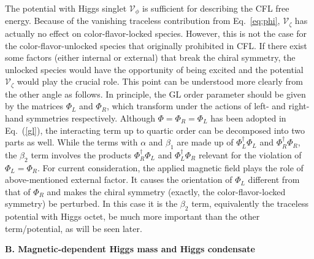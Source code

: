 \documentclass[12pt]{article}
\begin{document}
The potential with Higgs singlet $\mathcal{V}_\phi$ is sufficient for describing the CFL free energy. Because of
the vanishing traceless contribution from Eq.~\eqref{eq:phi}, $\mathcal{V}_\zeta$ has actually no effect on
color-flavor-locked species. However, this is not the case for the
color-flavor-unlocked species that originally prohibited in CFL. If there exist some factors (either internal or external) that break the chiral symmetry, the unlocked species would have the opportunity of being excited
and the potential $\mathcal{V}_\zeta$ would play the crucial role.
This point can be understood more clearly from the other angle as follows.
In principle, the GL order parameter should be given by the matrices $\Phi_L$ and $\Phi_R$, which transform under
the actions of left- and right-hand symmetries respectively.
Although $\Phi=\Phi_R=\Phi_L $ has been adopted in Eq.~(\ref{gl}), the interacting term up to quartic order can be
decomposed into two parts as well. While the terms with $\alpha$ and $\beta_1$ are made up of $\Phi_L^\dagger\Phi_L$
and $\Phi_R^\dagger\Phi_R$, the $\beta_2$ term involves the products $\Phi_R^\dagger\Phi_L$ and $\Phi_L^\dagger\Phi_R$
relevant for the violation of $\Phi_L=\Phi_R$.
For current consideration, the applied magnetic field plays the role of above-mentioned
external factor. It causes the orientation of $\Phi_L$ different from that of $\Phi_R$ and makes the chiral symmetry (exactly, the color-flavor-locked symmetry) be perturbed.
In this case it is the $\beta_2$ term, equivalently the traceless potential with Higgs octet, be much more important
than the other term/potential, as will be seen later.

\vspace{0.2cm} \textbf{B.  Magnetic-dependent Higgs mass and Higgs condensate}  \vspace{0.2cm}
\end{document}
